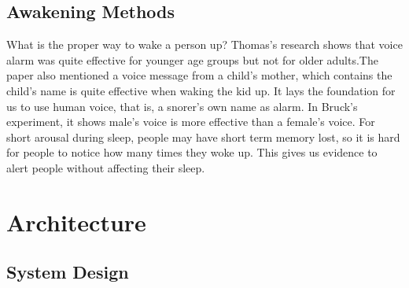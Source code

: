 \documentclass[conference]{IEEEtran}
\begin{document}

\subsection{Awakening Methods} %
\label{sub:awakening_methods}

What is the proper way to wake a person up? Thomas's research shows that voice alarm was quite effective for younger age groups but not for older adults\cite{thomas2010awakening}.The paper\cite{thomas2010awakening} also mentioned a voice message from a child's mother, which contains the child's name is quite effective when waking the kid up. It lays the foundation for us to use human voice, that is, a snorer's own name as alarm. In Bruck's experiment, it shows male's voice is more effective than a female's voice\cite{bruck2008comparison}. For short arousal during sleep, people may have short term memory lost, so it is hard for people to notice how many times they woke up\cite{bonnet1983memory}. This gives us evidence to alert people without affecting their sleep.





\section{Architecture} %
\label{sec:architecture}
\subsection{System Design} %
\label{sub:overview_design}
\end{document}
